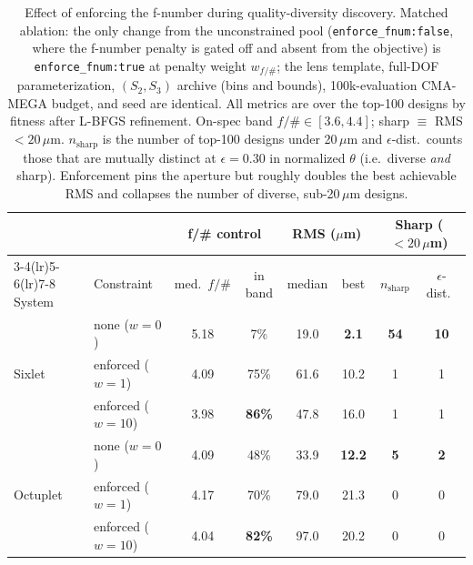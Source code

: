 \begin{table}[t]
\centering
\caption{Effect of enforcing the f-number during quality-diversity
discovery. Matched ablation: the only change from the unconstrained pool
(\texttt{enforce\_fnum:false}, where the f-number penalty is gated off and
absent from the objective) is \texttt{enforce\_fnum:true} at penalty weight
$w_{f/\#}$; the lens template, full-DOF parameterization, $(S_2,S_3)$ archive
(bins and bounds), 100k-evaluation CMA-MEGA budget, and seed are identical.
All metrics are over the top-100 designs by fitness after L-BFGS refinement.
On-spec band $f/\#\!\in\![3.6,4.4]$; sharp $\equiv$ RMS $<20\,\mu$m.
$n_{\mathrm{sharp}}$ is the number of top-100 designs under 20\,$\mu$m and
$\epsilon$-dist.\ counts those that are mutually distinct at $\epsilon\!=\!0.30$
in normalized $\theta$ (i.e.\ diverse \emph{and} sharp). Enforcement pins the
aperture but roughly doubles the best achievable RMS and collapses the number
of diverse, sub-20\,$\mu$m designs.}
\label{tab:fnum_enforce}
\begin{tabular}{llcccccc}
\toprule
 & & \multicolumn{2}{c}{f/\# control} & \multicolumn{2}{c}{RMS ($\mu$m)} & \multicolumn{2}{c}{Sharp ($<20\,\mu$m)} \\
\cmidrule(lr){3-4}\cmidrule(lr){5-6}\cmidrule(lr){7-8}
System & Constraint & med.\ $f/\#$ & in band & median & best & $n_{\mathrm{sharp}}$ & $\epsilon$-dist.\ \\
\midrule
\multirow{3}{*}{Sixlet}
 & none ($w{=}0$)       & 5.18 & 7\%           & 19.0 & \textbf{2.1}  & \textbf{54} & \textbf{10} \\
 & enforced ($w{=}1$)   & 4.09 & 75\%          & 61.6 & 10.2          & 1  & 1 \\
 & enforced ($w{=}10$)  & 3.98 & \textbf{86\%} & 47.8 & 16.0          & 1  & 1 \\
\midrule
\multirow{3}{*}{Octuplet}
 & none ($w{=}0$)       & 4.09 & 48\%          & 33.9 & \textbf{12.2} & \textbf{5} & \textbf{2} \\
 & enforced ($w{=}1$)   & 4.17 & 70\%          & 79.0 & 21.3          & 0  & 0 \\
 & enforced ($w{=}10$)  & 4.04 & \textbf{82\%} & 97.0 & 20.2          & 0  & 0 \\
\bottomrule
\end{tabular}
\end{table}

